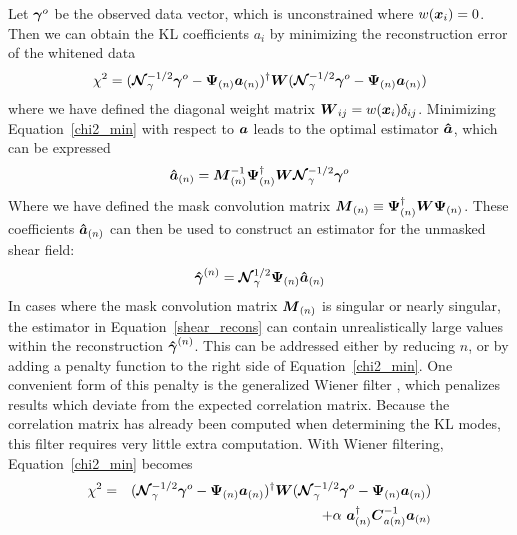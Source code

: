 Let $\boldsymbol{\gamma}^o$ be the observed data vector, 
which is unconstrained where
$w(\boldsymbol{x}_i)=0$.  Then we can obtain the KL coefficients $a_i$ by 
minimizing the reconstruction error of the whitened data
\begin{equation}
  \label{chi2_min}
  \chi^2 = ( \boldsymbol{\mathcal{N}}_\gamma^{-1/2}\boldsymbol{\gamma}^o
  - \boldsymbol{\Psi}_{(n)}\boldsymbol{a}_{(n)} )^\dagger 
  \boldsymbol{W}
  ( \boldsymbol{\mathcal{N}}_\gamma^{-1/2}\boldsymbol{\gamma}^o
  - \boldsymbol{\Psi}_{(n)}\boldsymbol{a}_{(n)} )
\end{equation}
where we have defined the diagonal weight matrix 
$\boldsymbol{W}_{ij} = w(\boldsymbol{x}_i) \delta_{ij}$.
Minimizing Equation~\ref{chi2_min} with respect to $\boldsymbol{a}$ leads to
the optimal estimator $\boldsymbol{\hat{a}}$, which can be expressed
\begin{equation}
 \boldsymbol{\hat{a}}_{(n)} = 
 \boldsymbol{M}_{(n)}^{-1} 
 \boldsymbol{\Psi}_{(n)}^\dagger \boldsymbol{W} \boldsymbol{\mathcal{N}}_\gamma^{-1/2}\boldsymbol{\gamma}^o
\end{equation}
Where we have defined the mask convolution matrix 
$\boldsymbol{M}_{(n)} \equiv \boldsymbol{\Psi}_{(n)}^\dagger\boldsymbol{W}\boldsymbol{\Psi}_{(n)}$.
These coefficients $\boldsymbol{\hat{a}}_{(n)}$
can then be used to construct an estimator for the unmasked shear field:
\begin{equation}
  \label{shear_recons}
  \boldsymbol{\hat{\gamma}}^{(n)} = \boldsymbol{\mathcal{N}}_\gamma^{1/2}\boldsymbol{\Psi}_{(n)}\boldsymbol{\hat{a}}_{(n)}
\end{equation}
In cases where the mask convolution matrix $\boldsymbol{M}_{(n)}$  
is singular or nearly singular, the estimator in Equation~\ref{shear_recons}
can contain unrealistically large values within the reconstruction 
$\boldsymbol{\hat{\gamma}}^{(n)}$.
This can be addressed either by reducing $n$, or by 
adding a penalty function to the right side of Equation~\ref{chi2_min}.  
One convenient form of this penalty is the generalized
Wiener filter \citep[see][]{Tegmark97}, which penalizes results which 
deviate from the expected correlation matrix.  Because the correlation
matrix has already been computed when determining the KL modes, 
this filter requires very little extra computation.
With Wiener filtering, Equation~\ref{chi2_min} becomes
\begin{eqnarray}
  \label{chi2_min_WF}
  \chi^2 & = & ( \Noise_\gamma^{-1/2}\myvec{\gamma}^o - \myvec{\Psi}_{(n)}\myvec{a}_{(n)} )^\dagger 
  \myvec{W} 
  (\Noise_\gamma^{-1/2}\myvec{\gamma}^o - \myvec{\Psi}_{(n)}\myvec{a}_{(n)} )
  \nonumber\\
  && + \alpha\ \myvec{a}_{(n)}^\dagger\myvec{C}_{a(n)}^{-1}\myvec{a}_{(n)}
\end{eqnarray}
